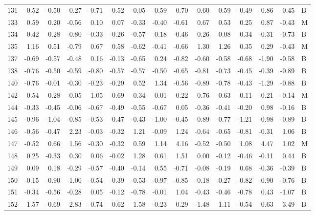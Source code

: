 \begin{table}[ht]
\begin{tabular}{rrrrrrrrrrrrrrl}
  131 & -0.52 & -0.50 & 0.27 & -0.71 & -0.52 & -0.05 & -0.59 & 0.70 & -0.60 & -0.59 & -0.49 & 0.86 & 0.45 & B \\ 
  133 & 0.59 & 0.20 & -0.56 & 0.10 & 0.07 & -0.33 & -0.40 & -0.61 & 0.67 & 0.53 & 0.25 & 0.87 & -0.43 & M \\ 
  134 & 0.42 & 0.28 & -0.80 & -0.33 & -0.26 & -0.57 & 0.18 & -0.46 & 0.26 & 0.08 & 0.34 & -0.31 & -0.73 & B \\ 
  135 & 1.16 & 0.51 & -0.79 & 0.67 & 0.58 & -0.62 & -0.41 & -0.66 & 1.30 & 1.26 & 0.35 & 0.29 & -0.43 & M \\ 
  137 & -0.69 & -0.57 & -0.48 & 0.16 & -0.13 & -0.65 & 0.24 & -0.82 & -0.60 & -0.58 & -0.68 & -1.90 & -0.58 & B \\ 
  138 & -0.76 & -0.50 & -0.59 & -0.80 & -0.57 & -0.57 & -0.50 & -0.65 & -0.81 & -0.73 & -0.45 & -0.39 & -0.89 & B \\ 
  140 & -0.76 & -0.01 & -0.30 & -0.23 & -0.29 & 0.52 & 1.34 & -0.56 & -0.89 & -0.78 & -0.43 & -1.29 & -0.88 & B \\ 
  142 & 0.54 & 0.28 & -0.05 & 1.05 & 0.69 & -0.34 & 0.01 & -0.22 & 0.76 & 0.63 & 0.11 & -0.21 & -0.14 & M \\ 
  144 & -0.33 & -0.45 & -0.06 & -0.67 & -0.49 & -0.55 & -0.67 & 0.05 & -0.36 & -0.41 & -0.20 & 0.98 & -0.16 & B \\ 
  145 & -0.96 & -1.04 & -0.85 & -0.53 & -0.47 & -0.43 & -1.00 & -0.45 & -0.89 & -0.77 & -1.21 & -0.98 & -0.89 & B \\ 
  146 & -0.56 & -0.47 & 2.23 & -0.03 & -0.32 & 1.21 & -0.09 & 1.24 & -0.64 & -0.65 & -0.81 & -0.31 & 1.06 & B \\ 
  147 & -0.52 & 0.66 & 1.56 & -0.30 & -0.32 & 0.59 & 1.14 & 4.16 & -0.52 & -0.50 & 1.08 & 4.47 & 1.02 & M \\ 
  148 & 0.25 & -0.33 & 0.30 & 0.06 & -0.02 & 1.28 & 0.61 & 1.51 & 0.00 & -0.12 & -0.46 & -0.11 & 0.44 & B \\ 
  149 & 0.09 & 0.18 & -0.29 & -0.57 & -0.40 & -0.14 & 0.55 & -0.71 & -0.08 & -0.19 & 0.68 & -0.36 & -0.39 & B \\ 
  150 & -0.15 & -0.90 & -1.00 & -0.54 & -0.39 & -0.53 & -0.97 & -0.85 & -0.18 & -0.27 & -0.82 & -0.90 & -0.76 & B \\ 
  151 & -0.34 & -0.56 & -0.28 & 0.05 & -0.12 & -0.78 & -0.01 & 1.04 & -0.43 & -0.46 & -0.78 & 0.43 & -1.07 & B \\ 
  152 & -1.57 & -0.69 & 2.83 & -0.74 & -0.62 & 1.58 & -0.23 & 0.29 & -1.48 & -1.11 & -0.54 & 0.63 & 3.49 & B \\ 

\end{tabular}
\end{table}
